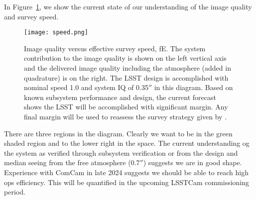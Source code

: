 In Figure~\ref{speed}, we show the current state of our understanding of the image quality and survey speed.

\begin{figure}[t]
  \centering
\texttt{[image: speed.png]}
\caption{Image quality versus effective survey speed, fE. The system contribution to the image quality is shown on the left vertical axis and the delivered image quality including the atmosphere (added in quadrature) is on the right. The LSST design is accomplished with nominal speed 1.0 and system IQ of 0.35$''$ in this diagram. Based on known subsystem performance and design, the current forecast shows the LSST will be accomplished with significant margin. Any final margin will be used to reassess the survey strategy given by \cite{PSTN-056}.}
\label{speed}
\end{figure}

There are three regions in the diagram. Clearly we want to be in the green shaded region and to the lower right in the space. The current understanding og the system as verified through subsystem verification or from the design and median seeing from the free atmosphere (0.7$''$) suggests we are in good shape. Experience with ComCam in late 2024 suggests we should be able to reach high ops efficiency. This will be quantified in the upcoming LSSTCam commissioning period.  


